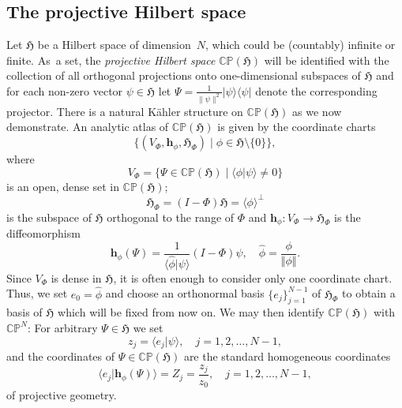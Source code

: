 \documentclass[11pt]{amsart}
\numberwithin{equation}{section}
\theoremstyle{remark}
\newcommand\HH{\mathfrak H}
\newcommand{\be}{\begin{equation}}
\newcommand{\en}{\end{equation}}
\newcommand{\s }{\mathbf}
\newcommand{\prhs}{{\mathbb C\mathbb P}( \HH)}
\newcommand{\C}{\mathbb C}
\begin{document}
\subsection{The projective Hilbert space}\label{projhilbsp}
Let $\HH$ be a Hilbert space of dimension~$N$, which could be (countably)
infinite or finite. As~a set, the {\sl projective Hilbert space\/} $\prhs$ will
be identified with the collection of all orthogonal projections onto
one-dimensional subspaces of $\HH$ and  for each non-zero vector $\psi \in \HH$
let  $\Psi = \frac{1}{\parallel \psi \parallel^2}\vert \psi\rangle\langle  \psi
\vert$ denote the corresponding projector. There is a natural  K\"ahler
structure on $\prhs$ as we now demonstrate. An analytic atlas of $\prhs$ is
given by the coordinate charts
\be
  \{ (V_{\Phi}, {\s h}_\phi , \HH_\Phi) \mid \phi \in \HH\setminus\{0\}  \},
\en
where
\be
 V_{\Phi} = \{ \Psi \in \prhs \mid \langle\phi \vert  \psi \rangle \not= 0\}
\en
is an open, dense set in $\prhs$;
\be
 {\HH}_\Phi = (I - \Phi){\HH} = \langle\phi\rangle^\perp
\en
is the subspace of $\HH$ orthogonal to the range of $\Phi$ and ${\s h}_\phi :
V_\Phi \to {\HH}_\Phi$ is the diffeomorphism
\begin{equation}
 {\s h}_\phi (\Psi) = \frac{1}{\langle \hat \phi\vert
 \psi\rangle}(I - \Phi)\psi,
  \quad \hat\phi = \frac{\phi}{\Vert\phi\Vert}.
\end{equation}
Since $V_\Phi$ is dense in $\HH$, it is often enough to consider only one
coordinate chart. Thus, we set $e_0 = \hat \phi$ and  choose an orthonormal
basis $\{e_j\}_{j=1}^{N-1}$ of $\HH_\Phi$ to obtain  a basis of $\HH$ which
will be fixed from now on. We may then identify $\prhs$ with
${\C}{\mathbb P}^N$: For arbitrary $\Psi \in \HH$ we set
\begin{equation}\label{coord}
z_j = \langle e_j |\psi \rangle, \quad j = 1,2, \ldots , N-1,
\end{equation}
and the coordinates of $\Psi \in \prhs$ are the standard homogeneous
coordinates
\begin{equation}
 \langle e_j \vert {\s h}_\phi (\Psi)\rangle =  Z_j = \frac{z_j}{z_0},
   \quad j = 1,2, \ldots , N-1,
 \label{homogcoord}
\end{equation}
of projective geometry.
\end{document}
